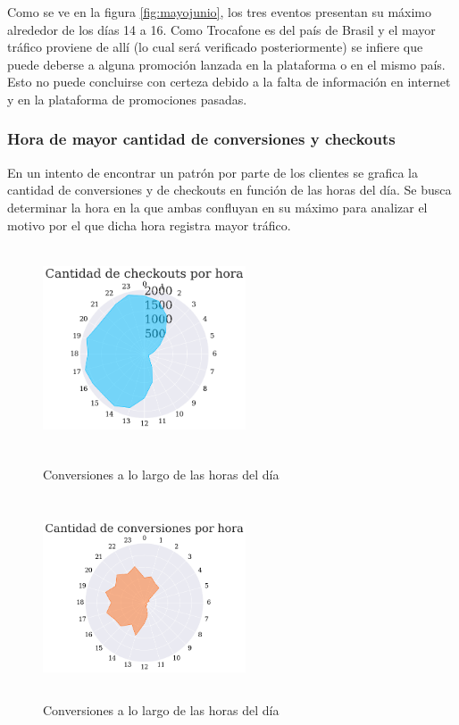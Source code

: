 \documentclass[a4paper]{article}
\begin{document}
Como se ve en la figura \ref{fig:mayojunio}, los tres eventos presentan su máximo alrededor de los días 14 a 16. Como Trocafone es del país de Brasil y el mayor tráfico proviene de allí (lo cual será verificado posteriormente) se infiere que puede deberse a alguna promoción lanzada en la plataforma o en el mismo país. Esto no puede concluirse con certeza debido a la falta de información en internet y en la plataforma de promociones pasadas.

\subsubsection{Hora de mayor cantidad de conversiones y checkouts}

En un intento de encontrar un patrón por parte de los clientes se grafica la cantidad de conversiones y de checkouts en función de las horas del día. Se busca determinar la hora en la que ambas confluyan en su máximo para analizar el motivo por el que dicha hora registra mayor tráfico.

\begin{figure}[h!]
	\centering
	\begin{minipage}[b]{0.4\textwidth}
		\includegraphics[width=6cm,height=6cm,keepaspectratio]{figures/041-hours-checkout-radarchart.png}
		\caption{Conversiones a lo largo de las horas del día}
	\end{minipage}
	\hfill
	\begin{minipage}[b]{0.4\textwidth}
		\includegraphics[width=6cm,height=6cm,keepaspectratio]{figures/040-hours-conversion-radarchart.png}
		\caption{Conversiones a lo largo de las horas del día}
	\end{minipage}
\end{figure}
\end{document}
